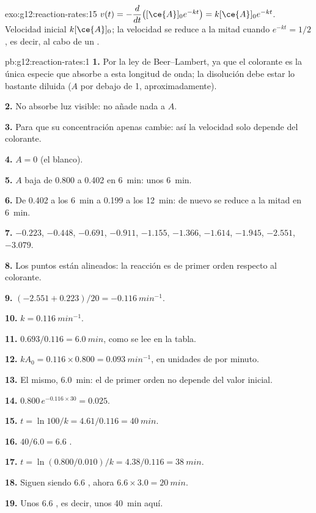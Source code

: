 \begin{solution}{exo:g12:reaction-rates:15}
$v(t) = -\dfrac{d}{dt}\big([\ce{A}]_0 e^{-kt}\big) = k[\ce{A}]_0 e^{-kt}$.
Velocidad inicial $k[\ce{A}]_0$; la velocidad se reduce a la mitad cuando
$e^{-kt} = 1/2$, es decir, al cabo de un .
\end{solution}

\begin{solution}{pb:g12:reaction-rates:1}
\textbf{1.} Por la ley de Beer--Lambert, ya que el colorante es la única
especie que absorbe a esta longitud de onda; la disolución debe estar lo
bastante diluida ($A$ por debajo de 1, aproximadamente).

\textbf{2.} No absorbe luz visible: no añade nada a $A$.

\textbf{3.} Para que su concentración apenas cambie: así la velocidad
solo depende del colorante.

\textbf{4.} $A = 0$ (el blanco).

\textbf{5.} $A$ baja de 0.800 a 0.402 en \qty{6}{min}: unos
\qty{6}{min}.

\textbf{6.} De 0.402 a los \qty{6}{min} a 0.199 a los \qty{12}{min}: de
nuevo se reduce a la mitad en \qty{6}{min}.

\textbf{7.} $-0.223$, $-0.448$, $-0.691$, $-0.911$, $-1.155$, $-1.366$,
$-1.614$, $-1.945$, $-2.551$, $-3.079$.

\textbf{8.} Los puntos están alineados: la reacción es de primer orden
respecto al colorante.

\textbf{9.} $(-2.551 + 0.223)/20 = \qty{-0.116}{min^{-1}}$.

\textbf{10.} $k = \qty{0.116}{min^{-1}}$.

\textbf{11.} $0.693 / 0.116 = \qty{6.0}{min}$, como se lee en la tabla.

\textbf{12.} $k A_0 = 0.116 \times 0.800 = \qty{0.093}{min^{-1}}$, en
unidades de  por minuto.

\textbf{13.} El mismo, \qty{6.0}{min}: el  de
primer orden no depende del valor inicial.

\textbf{14.} $0.800\, e^{-0.116 \times 30} = 0.025$.

\textbf{15.} $t = \ln 100 / k = 4.61 / 0.116 = \qty{40}{min}$.

\textbf{16.} $40 / 6.0 = 6.6$ .

\textbf{17.} $t = \ln(0.800/0.010)/k = 4.38 / 0.116 = \qty{38}{min}$.

\textbf{18.} Siguen siendo 6.6 , ahora
$6.6 \times 3.0 = \qty{20}{min}$.

\textbf{19.} Unos 6.6 , es decir, unos
\qty{40}{min} aquí.
\end{solution}

